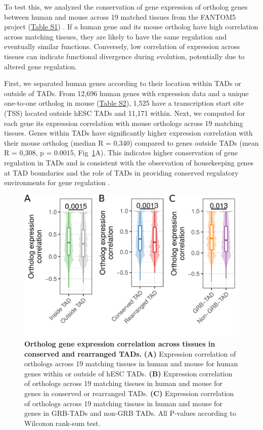 \documentclass[a4paper,twoside=true,openright,parskip=full,chapterprefix=true,11pt,headings=normal,bibliography=totoc,listof=totoc,titlepage=on,captions=tableabove,draft=false]{scrreprt}
\theoremstyle{definition}
\theoremstyle{definition}
\theoremstyle{definition}
\theoremstyle{remark}
\begin{document}
To test this, we analyzed the conservation of gene expression of
ortholog genes between human and mouse across 19 matched tissues from
the FANTOM5 project (\protect\hyperlink{TadEvoSupTab}{Table S1})
\citep{Forrest2014}. If a human gene and its mouse ortholog have high
correlation across matching tissues, they are likely to have the same
regulation and eventually similar functions. Conversely, low correlation
of expression across tissues can indicate functional divergence during
evolution, potentially due to altered gene regulation.

First, we separated human genes according to their location within TADs
or outside of TADs. From 12,696 human genes with expression data and a
unique one-to-one ortholog in mouse
(\protect\hyperlink{TadEvoSupTab}{Table S2}), 1,525 have a transcription
start site (TSS) located outside hESC TADs and 11,171 within. Next, we
computed for each gene its expression correlation with mouse orthologs
across 19 matching tissues. Genes within TADs have significantly higher
expression correlation with their mouse ortholog (median R = 0,340)
compared to genes outside TADs (mean R = 0,308, p = 0.0015,
Fig~\ref{fig:TadEvo4}A). This indicates higher conservation of gene
regulation in TADs and is consistent with the observation of
housekeeping genes at TAD boundaries \citep{Dixon2012} and the role of
TADs in providing conserved regulatory environments for gene regulation
\citep{Harmston2017, Ibn-Salem2017}.

\begin{figure}

{\centering \includegraphics[width=0.8\linewidth]{figures/TAD_evolution/fig4_v04} 

}

\caption{\textbf{Ortholog gene expression correlation across
tissues in conserved and rearranged TADs.} \textbf{(A)} Expression
correlation of orthologs across 19 matching tissues in human and mouse
for human genes within or outside of hESC TADs. \textbf{(B)} Expression
correlation of orthologs across 19 matching tissues in human and mouse
for genes in conserved or rearranged TADs. \textbf{(C)} Expression
correlation of orthologs across 19 matching tissues in human and mouse
for genes in GRB-TADs and non-GRB TADs. All P-values according to
Wilcoxon rank-sum test.}\label{fig:TadEvo4}
\end{figure}
\end{document}

